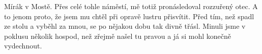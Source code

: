 
Mírák v Mostě. Přes celé tohle náměstí, mě totiž pronásledoval
rozzuřený otec. A to jenom proto, že jsem mu chtěl při opravě lustru
přisvítit. Před tím, než spadl ze stolu a vyběhl za mnou, se po
nějakou dobu tak divně třásl. Minuli jsme v poklusu několik hospod,
než zřejmě našel tu pravou a já si mohl konečně vydechnout.

